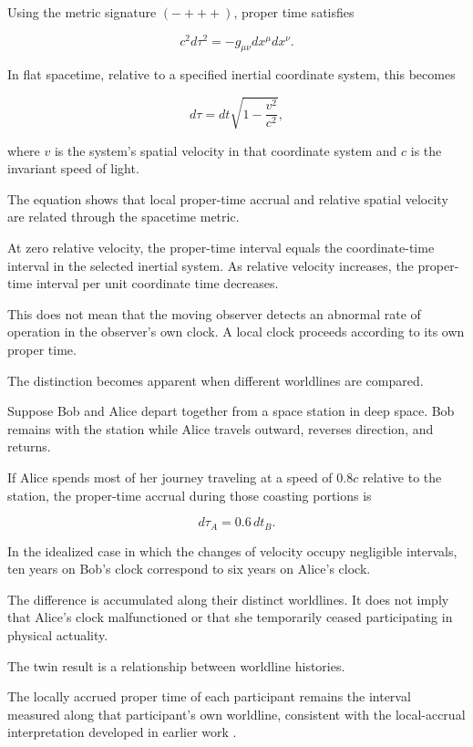 \documentclass[12pt,onecolumn]{article}
\begin{document}
Using the metric signature \((-+++)\), proper time satisfies

\begin{equation}
c^2d\tau^2=-g_{\mu\nu}dx^\mu dx^\nu.
\end{equation}

In flat spacetime, relative to a specified inertial coordinate system, this becomes

\begin{equation}
d\tau=dt\sqrt{1-\frac{v^2}{c^2}},
\end{equation}

where \(v\) is the system's spatial velocity in that coordinate system and \(c\) is the invariant speed of light.

The equation shows that local proper-time accrual and relative spatial velocity are related through the spacetime metric.

At zero relative velocity, the proper-time interval equals the coordinate-time interval in the selected inertial system. As relative velocity increases, the proper-time interval per unit coordinate time decreases.

This does not mean that the moving observer detects an abnormal rate of operation in the observer's own clock. A local clock proceeds according to its own proper time.

The distinction becomes apparent when different worldlines are compared.

Suppose Bob and Alice depart together from a space station in deep space. Bob remains with the station while Alice travels outward, reverses direction, and returns.

If Alice spends most of her journey traveling at a speed of \(0.8c\) relative to the station, the proper-time accrual during those coasting portions is

\begin{equation}
d\tau_A=0.6\,dt_B.
\end{equation}

In the idealized case in which the changes of velocity occupy negligible intervals, ten years on Bob's clock correspond to six years on Alice's clock.

The difference is accumulated along their distinct worldlines. It does not imply that Alice's clock malfunctioned or that she temporarily ceased participating in physical actuality.

The twin result is a relationship between worldline histories.

The locally accrued proper time of each participant remains the interval measured along that participant's own worldline, consistent with the local-accrual interpretation developed in earlier work \cite{Accrual,DilationProperty,WorldlinesProduce}.
\end{document}

